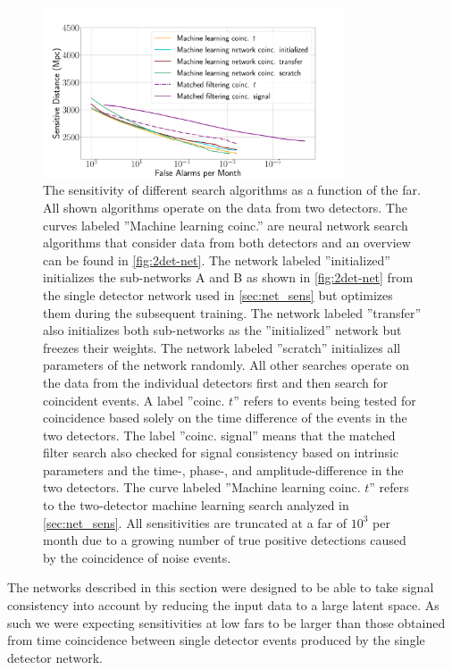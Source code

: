 \begin{figure}
    \centering
    \includegraphics[width=0.8\textwidth, trim=1cm 0 4cm 3cm, clip]{chapters/cnn_coinc/images/sens-2.pdf}
    \caption[Sensitivity of different coincidence strategies]{The sensitivity of different search algorithms as a function of the \acrshort{far}. All shown algorithms operate on the data from two detectors. The curves labeled ''Machine learning coinc.'' are neural network search algorithms that consider data from both detectors and an overview can be found in \autoref{fig:2det-net}. The network labeled ''initialized'' initializes the sub-networks A and B as shown in \autoref{fig:2det-net} from the single detector network used in \autoref{sec:net_sens} but optimizes them during the subsequent training. The network labeled ''transfer'' also initializes both sub-networks as the ''initialized'' network but freezes their weights. The network labeled ''scratch'' initializes all parameters of the network randomly. All other searches operate on the data from the individual detectors first and then search for coincident events. A label ''coinc. $t$'' refers to events being tested for coincidence based solely on the time difference of the events in the two detectors. The label ''coinc. signal'' means that the matched filter search also checked for signal consistency based on intrinsic parameters and the time-, phase-, and amplitude-difference in the two detectors. The curve labeled ''Machine learning coinc. $t$'' refers to the two-detector machine learning search analyzed in \autoref{sec:net_sens}. All sensitivities are truncated at a \acrshort{far} of $10^3$ per month due to a growing number of true positive detections caused by the coincidence of noise events.}
    \label{fig:dual_net_sens}
\end{figure}

The networks described in this section were designed to be able to take signal consistency into account by reducing the input data to a large latent space. As such we were expecting sensitivities at low \acrshort{far}s to be larger than those obtained from time coincidence between single detector events produced by the single detector network.

